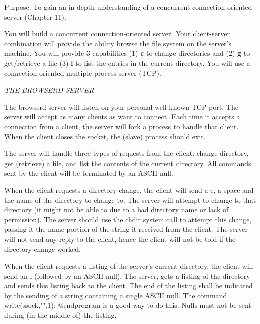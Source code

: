 

\parindent 0pt

Purpose: To gain an in-depth understanding of
a concurrent connection-oriented server (Chapter 11).

You will build a concurrent connection-oriented server.
Your client-server combination will provide the ability browse
the file system on the server's machine.
You will provide 3 capabilities 
(1) {\bf c} to change directories and
(2) {\bf g} to get/retrieve a file
(3) {\bf l} to list the entries in the current directory.
You will use a connection-oriented multiple process server (TCP).

{\it THE BROWSERD SERVER}

The {\ltt{}browserd} server will listen on your personal well-known TCP port.
The server will accept as many clients as want to connect.
Each time it accepts a connection from a client,
the server will fork a process to handle that client. 
When the client closes the socket, the (slave) process should exit.

The server will handle three types of requests from the client:
change directory,
get (retrieve) a file,
and list the contents of the current directory.
All commands sent by the client will be terminated by an ASCII null.

When the client requests a directory change,
the client will send a c, a space and the name of the directory
to change to.
The server will attempt to change to that directory (it might not be able
to due to a bad directory name or lack of permission).
The server should use the {\ltt{}chdir} system call to attempt this change,
passing it the name portion of the string it received from the client.
The server will not send any reply to the client,
hence the client will not be told if the directory change worked.

When the client requests a listing of the server's current directory,
the client will send an l (followed by an ASCII null).
The server, gets a listing of the directory and sends this listing
back to the client.
The end of the listing shall be indicated by the sending of a string
containing a single ASCII null.
The command
{\cprogram
write(ssock,"\0",1);
@endprogram} 
is a good way to do this.
Nulls must not be sent during (in the middle of) the listing. 

